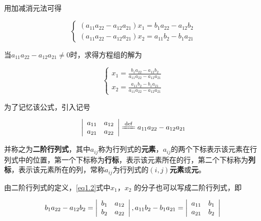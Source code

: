 \begin{solution}
    用加减消元法可得

    \begin{equation}
        \left\{
        \begin{array}{c}
            (a_{11}a_{22}-a_{12}a_{21})x_1=b_1a_{22}-a_{12}b_{2} \\
            (a_{11}a_{22}-a_{12}a_{21})x_2=a_{11}b_{2}-b_{1}a_{21}
        \end{array}
        \right.\label{eq1.2}
    \end{equation}

    当$a_{11}a_{22}-a_{12}a_{21}\ne  0$时，求得方程组的解为

    \begin{equation}
        \left\{
        \begin{array}{c}
            x_1=\frac{b_1a_{22}-a_{12}b_{2}}{a_{11}a_{22}-a_{12}a_{21}} \\
            x_2=\frac{a_{11}b_{2}-b_{1}a_{21}}{a_{11}a_{22}-a_{12}a_{21}}
        \end{array}
        \right.
    \end{equation}
\end{solution}

为了记忆该公式，引入记号

$$\left|\begin{array}{ccc}
        a_{11} & a_{12} \\
        a_{21} & a_{22}
    \end{array}\right| \xlongequal{\rm def} a_{11}a_{22}-a_{12}a_{21} $$

并称之为\textbf{二阶行列式}，其中$a_{ij}$称为行列式的\textbf{元素}，$a_{ij}$的两个下标表示该元素在行列式中的位置，第一个下标称为\textbf{行标}，表示该元素所在的行，第二个下标称为\textbf{列标}，表示该元素所在的列，常称$a_{ij}$为行列式的\textbf{$(i,j)$元素}或\textbf{元}。

由二阶行列式的定义，\ref{eq1.2}式中$x_1$，$x_2$ 的分子也可以写成二阶行列式，即

$$
    b_1a_{22}-a_{12}b_{2}= \left|\begin{array}{ccc}
        b_1 & a_{12} \\
        b_2 & a_{22}
    \end{array}\right| , a_{11}b_{2}-b_{1}a_{21}= \left|\begin{array}{ccc}
        a_{11} & b_1 \\
        a_{21} & b_2
    \end{array}\right|  \\
$$

